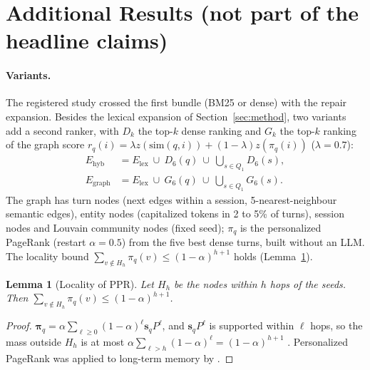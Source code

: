 \documentclass[10pt]{article}
\theoremstyle{plain}
\newtheorem{lemma}{Lemma}
\begin{document}
\section{Additional Results (not part of the headline claims)}
\label{app:more}

\paragraph{Variants.} The registered study crossed the first bundle (BM25 or dense) with the repair expansion. Besides the
lexical expansion of Section~\ref{sec:method}, two variants add a second ranker, with $D_k$ the top-$k$ dense ranking and
$G_k$ the top-$k$ ranking of the graph score $r_q(i)=\lambda z(\mathrm{sim}(q,i))+(1-\lambda)z(\pi_q(i))$ ($\lambda=0.7$):
\begin{align}
E_{\mathrm{hyb}}&=E_{\mathrm{lex}}\ \cup\ D_6(q)\ \cup\ \textstyle\bigcup_{s\in Q_1}D_6(s),\\
E_{\mathrm{graph}}&=E_{\mathrm{lex}}\ \cup\ G_6(q)\ \cup\ \textstyle\bigcup_{s\in Q_1}G_6(s).
\end{align}
The graph has turn nodes (\textsf{next} edges within a session, 5-nearest-neighbour semantic edges), entity nodes
(capitalized tokens in 2 to 5\% of turns), session nodes and Louvain community nodes (fixed seed); $\pi_q$ is the
personalized PageRank (restart $\alpha=0.5$) from the five best dense turns, built without an LLM. The locality bound
$\sum_{v\notin H_h}\pi_q(v)\le(1-\alpha)^{h+1}$ holds (Lemma~\ref{lem:ppr}).

\begin{lemma}[Locality of PPR]\label{lem:ppr}
Let $H_h$ be the nodes within $h$ hops of the seeds. Then $\sum_{v\notin H_h}\pi_q(v)\le(1-\alpha)^{h+1}$.
\end{lemma}
\begin{proof}
$\boldsymbol\pi_q=\alpha\sum_{\ell\ge0}(1-\alpha)^{\ell}\mathbf{s}_qP^{\ell}$, and $\mathbf{s}_qP^{\ell}$ is supported
within $\ell$ hops, so the mass outside $H_h$ is at most $\alpha\sum_{\ell>h}(1-\alpha)^{\ell}=(1-\alpha)^{h+1}$
\citep{andersen2006local}. Personalized PageRank was applied to long-term memory by \citet{gutierrez2024hipporag}.
\end{proof}
\end{document}

